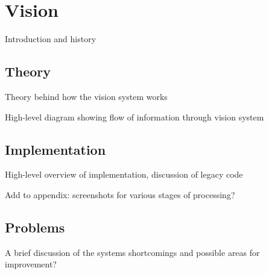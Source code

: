 \section{Vision}

Introduction and history

\subsection{Theory}

Theory behind how the vision system works

High-level diagram showing flow of information through vision system

\subsection{Implementation}

High-level overview of implementation, discussion of legacy code

Add to appendix: screenshots for various stages of processing?

\subsection{Problems}

A brief discussion of the systems shortcomings and possible areas for improvement?
